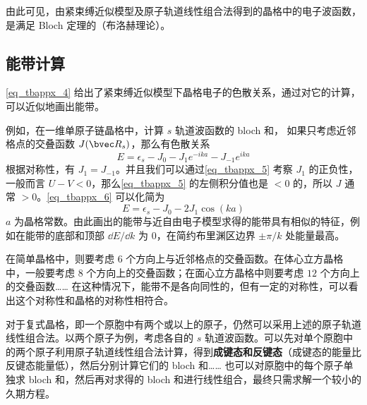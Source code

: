 由此可见，由紧束缚近似模型及原子轨道线性组合法得到的晶格中的电子波函数，是满足 Bloch 定理的（布洛赫理论）。

\subsection{能带计算}
\autoref{eq_tbappx_4} 给出了紧束缚近似模型下晶格电子的色散关系，通过对它的计算，可以近似地画出能带。

例如，在一维单原子链晶格中，计算 $s$ 轨道波函数的 bloch 和， 如果只考虑近邻格点的交叠函数 $J(\bvec R_s)$，那么有色散关系
\begin{equation}\label{eq_tbappx_6}
E=\epsilon_s-J_0-J_1 e^{-i k a}-J_{-1}e^{ika}
\end{equation}
根据对称性，有 $J_1=J_{-1}$。并且我们可以通过\autoref{eq_tbappx_5} 考察 $J_1$ 的正负性，一般而言 $U-V<0$，那么\autoref{eq_tbappx_5} 的左侧积分值也是 $<0$ 的，所以 $J$ 通常 $>0$。\autoref{eq_tbappx_6} 可以化简为
\begin{equation}
E=\epsilon_s-J_0-2J_1\cos(ka)
\end{equation}
$a$ 为晶格常数。由此画出的能带与近自由电子模型求得的能带具有相似的特征，例如在能带的底部和顶部 $\dd E/\dd k$ 为 $0$，在简约布里渊区边界 $\pm \pi/k$ 处能量最高。

在简单晶格中，则要考虑 $6$ 个方向上与近邻格点的交叠函数。在体心立方晶格中，一般要考虑 $8$ 个方向上的交叠函数；在面心立方晶格中则要考虑 $12$ 个方向上的交叠函数…… 在这种情况下，能带不是各向同性的，但有一定的对称性，可以看出这个对称性和晶格的对称性相符合。

对于复式晶格，即一个原胞中有两个或以上的原子，仍然可以采用上述的原子轨道线性组合法。以两个原子为例，考虑各自的 $s$ 轨道波函数。可以先对单个原胞中的两个原子利用原子轨道线性组合法计算，得到\textbf{成键态和反键态}（成键态的能量比反键态能量低），然后分别计算它们的 bloch 和…… 也可以对原胞中的每个原子单独求 bloch 和，然后再对求得的 bloch 和进行线性组合，最终只需求解一个较小的久期方程。